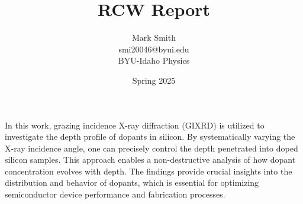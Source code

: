 \documentclass{article}
\title{RCW Report}
\author{Mark Smith \vspace{1.5mm} \\ smi20046@byui.edu \vspace{1.5mm} \\ BYU-Idaho Physics}
\date{Spring 2025}
\begin{document}
\maketitle


\section*{}
    In this work, grazing incidence X-ray diffraction (GIXRD) is utilized to investigate the depth profile of dopants in silicon. 
    By systematically varying the X-ray incidence angle, one can precisely control the depth penetrated into doped silicon samples. 
    This approach enables a non-destructive analysis of how dopant concentration evolves with depth. 
    The findings provide crucial insights into the distribution and behavior of dopants, which is essential for optimizing semiconductor device performance and fabrication processes.


\end{document}
